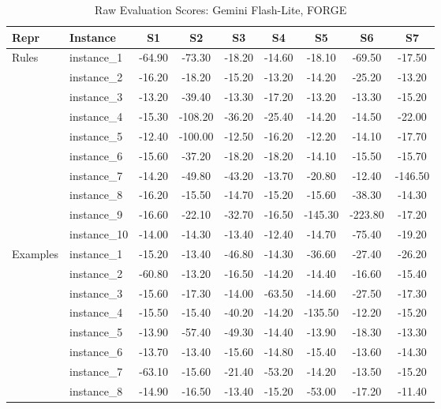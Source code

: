 \documentclass[sigconf]{acmart}
\begin{document}
\begin{table}[htbp]
\centering
\scriptsize
\caption{Raw Evaluation Scores: Gemini Flash-Lite, FORGE}
\label{tab:raw-gemini-best}
\begin{tabular}{llccccccc}
\toprule
\textbf{Repr} & \textbf{Instance} & \textbf{S1} & \textbf{S2} & \textbf{S3} & \textbf{S4} & \textbf{S5} & \textbf{S6} & \textbf{S7} \\
\midrule
Rules & instance\_1 & -64.90 & -73.30 & -18.20 & -14.60 & -18.10 & -69.50 & -17.50 \\
 & instance\_2 & -16.20 & -18.20 & -15.20 & -13.20 & -14.20 & -25.20 & -13.20 \\
 & instance\_3 & -13.20 & -39.40 & -13.30 & -17.20 & -13.20 & -13.30 & -15.20 \\
 & instance\_4 & -15.30 & -108.20 & -36.20 & -25.40 & -14.20 & -14.50 & -22.00 \\
 & instance\_5 & -12.40 & -100.00 & -12.50 & -16.20 & -12.20 & -14.10 & -17.70 \\
 & instance\_6 & -15.60 & -37.20 & -18.20 & -18.20 & -14.10 & -15.50 & -15.70 \\
 & instance\_7 & -14.20 & -49.80 & -43.20 & -13.70 & -20.80 & -12.40 & -146.50 \\
 & instance\_8 & -16.20 & -15.50 & -14.70 & -15.20 & -15.60 & -38.30 & -14.30 \\
 & instance\_9 & -16.60 & -22.10 & -32.70 & -16.50 & -145.30 & -223.80 & -17.20 \\
 & instance\_10 & -14.00 & -14.30 & -13.40 & -12.40 & -14.70 & -75.40 & -19.20 \\
\midrule
Examples & instance\_1 & -15.20 & -13.40 & -46.80 & -14.30 & -36.60 & -27.40 & -26.20 \\
 & instance\_2 & -60.80 & -13.20 & -16.50 & -14.20 & -14.40 & -16.60 & -15.40 \\
 & instance\_3 & -15.60 & -17.30 & -14.00 & -63.50 & -14.60 & -27.50 & -17.30 \\
 & instance\_4 & -15.50 & -15.40 & -40.20 & -14.20 & -135.50 & -12.20 & -15.20 \\
 & instance\_5 & -13.90 & -57.40 & -49.30 & -14.40 & -13.90 & -18.30 & -13.30 \\
 & instance\_6 & -13.70 & -13.40 & -15.60 & -14.80 & -15.40 & -13.60 & -14.30 \\
 & instance\_7 & -63.10 & -15.60 & -21.40 & -53.20 & -14.20 & -13.50 & -15.20 \\
 & instance\_8 & -14.90 & -16.50 & -13.40 & -15.20 & -53.00 & -17.20 & -11.40 \\

\end{tabular}
\end{table}
\end{document}
